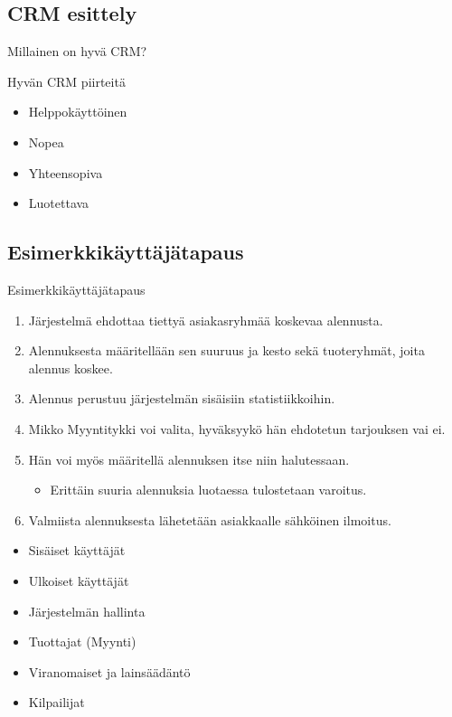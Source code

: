 \documentclass{beamer}
\begin{document}
\subsection{CRM esittely}

\begin{frame}{Millainen on hyvä CRM?}

Hyvän CRM piirteitä

	\begin{itemize}
		\item<2-> Helppokäyttöinen
		\item<3-> Nopea
		\item<4-> Yhteensopiva
		\item<5-> Luotettava
	\end{itemize}
\end{frame}

\subsection{Esimerkki\-käyttäjä\-tapaus}

\begin{frame}{Esimerkkikäyttäjätapaus}
	\begin{enumerate}
		\item Järjestelmä ehdottaa tiettyä asiakasryhmää koskevaa alennusta.
		\item Alennuksesta määritellään sen suuruus ja kesto sekä tuoteryhmät, joita alennus koskee.
		\item Alennus perustuu järjestelmän sisäisiin statistiikkoihin.
		\item Mikko Myyntitykki voi valita, hyväksyykö hän ehdotetun tarjouksen vai ei.
		\item Hän voi myös määritellä alennuksen itse niin halutessaan.
			\begin{itemize}
				\item Erittäin suuria alennuksia luotaessa tulostetaan varoitus.
			\end{itemize}
		\item Valmiista alennuksesta lähetetään asiakkaalle sähköinen ilmoitus.
	\end{enumerate}
	
\end{frame}

\begin{frame}
	\begin{itemize}
		\item Sisäiset käyttäjät
		\item Ulkoiset käyttäjät
		\item Järjestelmän hallinta
		\item Tuottajat (Myynti)
		\item Viranomaiset ja lainsäädäntö
		\item Kilpailijat
	\end{itemize}
\end{frame}
\end{document}
